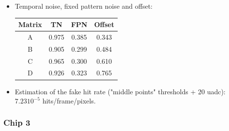 \documentclass[a4papper, 10pt]{article}
\begin{document}
\begin{itemize}
    \item Temporal noise, fixed pattern noise and offset:

            \begin{center}
              \begin{tabular}{ c c c c }
                \hline %
         \rowcolor{light-gray}         Matrix  &  TN   &  FPN  &  Offset  \tabularnewline
                \hline %
                \hline %
                    A     & 0.975 & 0.385 & 0.343    \tabularnewline
                \hline %
                    B     & 0.905 & 0.299 & 0.484   \tabularnewline
                \hline %
                    C     & 0.965 & 0.300 & 0.610   \tabularnewline
                \hline %
                    D     & 0.926 & 0.323 & 0.765    \tabularnewline
                \hline %
              \end{tabular}
            \end{center}
    
    \item Estimation of the fake hit rate ("middle points" thresholds + 20 uadc): $7.23 10^{-5}$ hits/frame/pixels. 
    
    \end{itemize}

    \subsubsection{Chip 3}
    
\end{document}
